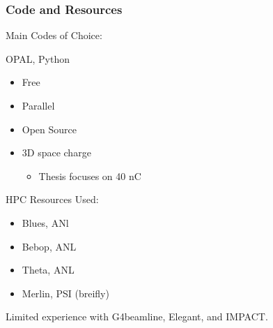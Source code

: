 \documentclass[professionalfonts,t]{beamer}
\begin{document}
\begin{frame}
\frametitle{Code and Resources}
Main Codes of Choice: 
\vspace{0.5em}

\begin{minipage}{0.5\textwidth}
OPAL, Python
\begin{itemize}
	\item Free
	\item Parallel 
	\item Open Source
	\item 3D space charge
	\begin{itemize}
		\item Thesis focuses on 40 nC
	\end{itemize}
\end{itemize}	
\end{minipage}
\begin{minipage}{0.4\textwidth}
	HPC Resources Used:
	\begin{itemize}
		\item Blues, ANl
		\item Bebop, ANL
		\item Theta, ANL
		\item Merlin, PSI (breifly)
	\end{itemize}
\end{minipage}


\vspace{1em}
Limited experience with G4beamline, Elegant, and IMPACT.
\end{frame}


\iffalse
\begin{frame}
\frametitle{Drive Line Layout}
\begin{tikzpicture}[scale=\textwidth/20cm, text=black]

\end{tikzpicture}
For the remainder of the talk, I will focus on simulation and experimental results for the beam line above.
\end{frame}
\fi
 
\end{document}
